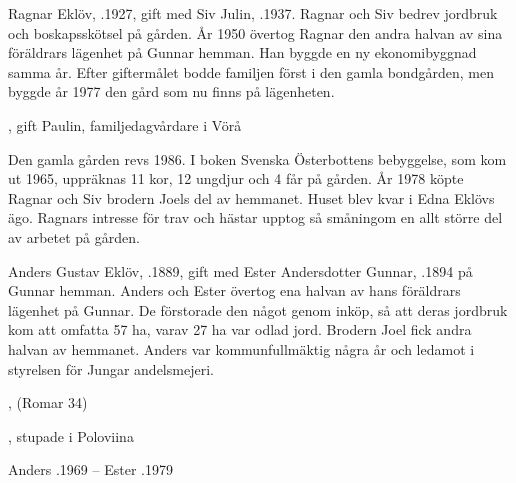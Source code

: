 Ragnar Eklöv, .1927, gift med Siv Julin, .1937. Ragnar och Siv bedrev jordbruk och boskapsskötsel på gården. År 1950 övertog Ragnar den andra halvan av sina föräldrars lägenhet på Gunnar hemman. Han byggde en ny ekonomibyggnad samma år. Efter giftermålet bodde familjen först i den gamla bondgården, men byggde år 1977 den gård som nu finns på lägenheten.
\begin{jhchildren}
  \item {}
  \item {}
  \item {}, gift Paulin, familjedagvårdare i Vörå
\end{jhchildren}
Den gamla gården revs 1986. I boken Svenska Österbottens bebyggelse, som  kom ut 1965, uppräknas 11 kor, 12 ungdjur och 4 får på gården. År 1978 köpte Ragnar och Siv brodern Joels del av hemmanet. Huset blev kvar i Edna Eklövs ägo. Ragnars intresse för trav och hästar upptog så småningom en allt större del av arbetet på gården.


Anders Gustav Eklöv, .1889, gift med Ester Andersdotter Gunnar, .1894 på Gunnar hemman. Anders och Ester övertog ena halvan av hans föräldrars lägenhet på Gunnar. De förstorade den något genom inköp, så att deras jordbruk kom att omfatta 57 ha, varav 27 ha var odlad jord. Brodern Joel fick andra halvan av hemmanet. Anders var kommunfullmäktig några år och ledamot i styrelsen för Jungar andelsmejeri.
\begin{jhchildren}
  \item {}
  \item {}, (Romar 34)
  \item {}
  \item {}
  \item {}, stupade i Poloviina
  \item {}
  \item {}
  \item {}
  \item {}
  \item {}
  \item {}
  \item {}
\end{jhchildren}
Anders .1969  --  Ester .1979


